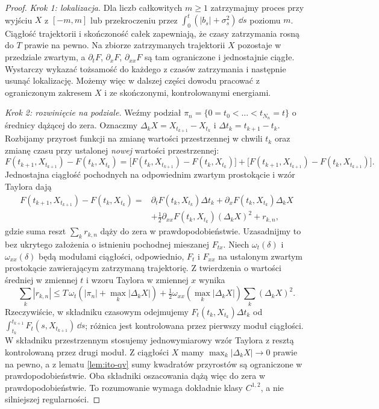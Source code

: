 \begin{proof}
\emph{Krok 1: lokalizacja.} Dla liczb całkowitych $m\ge1$
zatrzymajmy proces przy wyjściu $X$ z $[-m,m]$ lub
przekroczeniu przez $\int_0^t(|b_s|+\sigma_s^2)\,\dd s$
poziomu $m$. Ciągłość trajektorii i skończoność całek
zapewniają, że czasy zatrzymania rosną do $T$ prawie na pewno.
Na zbiorze zatrzymanych trajektorii $X$ pozostaje w
przedziale zwartym, a $\partial_tF$, $\partial_xF$,
$\partial_{xx}F$ są tam ograniczone i jednostajnie ciągłe.
Wystarczy wykazać tożsamość do każdego z czasów zatrzymania
i następnie usunąć lokalizację. Możemy więc w dalszej
części dowodu pracować z ograniczonym zakresem $X$
i ze skończonymi, kontrolowanymi energiami.

\emph{Krok 2: rozwinięcie na podziale.} Weźmy podział
$\pi_n=\{0=t_0<\dots<t_{N_n}=t\}$ o średnicy
dążącej do zera. Oznaczmy $\Delta_kX=X_{t_{k+1}}-X_{t_k}$
i $\Delta t_k=t_{k+1}-t_k$. Rozbijamy przyrost funkcji na zmianę wartości przestrzennej
w chwili $t_k$ oraz zmianę czasu przy 
ustalonej \emph{nowej} wartości przestrzennej:
\[
F(t_{k+1},X_{t_{k+1}})-F(t_k,X_{t_k})
=\bigl[F(t_k,X_{t_{k+1}})-F(t_k,X_{t_k})\bigr]
 +\bigl[F(t_{k+1},X_{t_{k+1}})-F(t_k,X_{t_{k+1}})\bigr].
\]
Jednostajna ciągłość pochodnych na odpowiednim zwartym
prostokącie i wzór Taylora dają
\[
\begin{split}
F(t_{k+1},X_{t_{k+1}})-F(t_k,X_{t_k})
={}&\partial_tF(t_k,X_{t_k})\Delta t_k
+\partial_xF(t_k,X_{t_k})\Delta_kX\\
&+\frac12\partial_{xx}F(t_k,X_{t_k})(\Delta_kX)^2+r_{k,n},
\end{split}
\]
gdzie suma reszt $\sum_k r_{k,n}$ dąży do zera
w prawdopodobieństwie. Uzasadnijmy to bez ukrytego
założenia o istnieniu pochodnej mieszanej $F_{tx}$.
Niech $\omega_t(\delta)$ i $\omega_{xx}(\delta)$
będą modułami ciągłości, odpowiednio, $F_t$ i $F_{xx}$
na ustalonym zwartym prostokącie zawierającym
zatrzymaną trajektorię. Z twierdzenia o wartości
średniej w zmiennej $t$ i wzoru Taylora w zmiennej $x$
wynika
\[
\sum_k|r_{k,n}|\le
T\,\omega_t\!\left(|\pi_n|+\max_k|\Delta_kX|\right)
+\tfrac12\omega_{xx}\!\left(\max_k|\Delta_kX|\right)
\sum_k(\Delta_kX)^2.
\]
Rzeczywiście, w składniku czasowym odejmujemy
$F_t(t_k,X_{t_k})\Delta t_k$ od
$\int_{t_k}^{t_{k+1}}F_t(s,X_{t_{k+1}})\,\dd s$;
różnica jest kontrolowana przez pierwszy moduł ciągłości.
W składniku przestrzennym stosujemy jednowymiarowy
wzór Taylora z resztą kontrolowaną przez drugi moduł.
Z ciągłości $X$ mamy $\max_k|\Delta_kX|\to0$
prawie na pewno, a z lematu \ref{lem:ito-qv} sumy
kwadratów przyrostów są ograniczone w prawdopodobieństwie.
Oba składniki oszacowania dążą więc do zera w
prawdopodobieństwie. To rozumowanie wymaga dokładnie
klasy $C^{1,2}$, a nie silniejszej regularności.


\end{proof}
